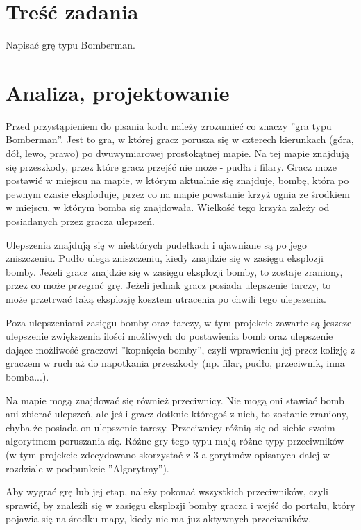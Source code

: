 \documentclass[12pt,a4paper]{article}
\begin{document}
\section{Treść zadania}
Napisać grę typu Bomberman.
\section{Analiza, projektowanie}
Przed przystąpieniem do pisania kodu należy zrozumieć co znaczy ''gra typu Bomberman''. Jest to gra, w której gracz porusza się w czterech kierunkach (góra, dół, lewo, prawo) 
po dwuwymiarowej prostokątnej mapie. Na tej mapie znajdują się przeszkody, przez które gracz przejść nie może - pudła i filary. 
Gracz może postawić w miejscu na mapie, w którym aktualnie się znajduje, bombę, która po pewnym czasie eksploduje, przez co na mapie powstanie krzyż ognia ze środkiem w miejscu, w którym bomba się znajdowała. Wielkość tego krzyża zależy od posiadanych przez gracza ulepszeń. 

Ulepszenia znajdują się w niektórych pudełkach i ujawniane są po jego zniszczeniu. Pudło ulega zniszczeniu, kiedy znajdzie się w zasięgu eksplozji bomby. Jeżeli gracz znajdzie się w zasięgu eksplozji bomby, to zostaje zraniony, przez co może przegrać grę. Jeżeli jednak gracz posiada ulepszenie tarczy, to może przetrwać taką eksplozję kosztem utracenia po chwili tego ulepszenia. 

Poza ulepszeniami zasięgu bomby oraz tarczy, w tym projekcie zawarte są jeszcze ulepszenie zwiększenia ilości możliwych do postawienia bomb oraz ulepszenie dające możliwość graczowi ''kopnięcia bomby'', czyli wprawieniu jej przez kolizję z graczem w ruch aż do napotkania przeszkody (np. filar, pudło, przeciwnik, inna bomba...).

Na mapie mogą znajdować się również przeciwnicy. Nie mogą oni stawiać bomb ani zbierać ulepszeń, ale jeśli gracz dotknie któregoś z nich, to zostanie zraniony, chyba że posiada on ulepszenie tarczy. Przeciwnicy różnią się od siebie swoim algorytmem poruszania się. Różne gry tego typu mają różne typy przeciwników (w tym projekcie zdecydowano skorzystać z 3 algorytmów opisanych dalej w rozdziale w podpunkcie ''Algorytmy'').

Aby wygrać grę lub jej etap, należy pokonać wszystkich przeciwników, czyli sprawić, by znaleźli się w zasięgu eksplozji bomby gracza i wejść do portalu, który pojawia się na środku mapy, kiedy nie ma juz aktywnych przeciwników.
\newline
\end{document}
